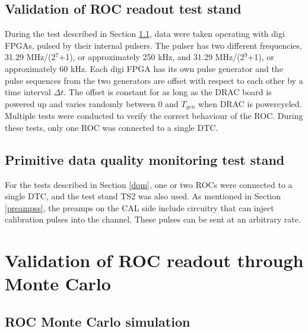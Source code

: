    \subsection{Validation of ROC readout test stand}
    During the test described in Section \ref{MonteCarlo}, data were taken operating with digi FPGAs, pulsed by their internal pulsers.
    The pulser has two different frequencies, 31.29 MHz/(2$^7$+1), or approximately 250 kHz, 
    and 31.29 MHz/(2$^9$+1), or approximately 60 kHz.
    Each digi FPGA has its own pulse generator and the pulse sequences from the two
    generators are offset with respect to each other by a time interval $\Delta t$. 
    The offset is constant for as long as the DRAC board is powered up and varies randomly between 0 and $T_{gen}$ when DRAC is powercycled. 
    Multiple tests were conducted to verify the correct behaviour of the ROC. 
    During these tests, only one ROC was connected to a single DTC. 
    \subsection{Primitive data quality monitoring test stand}
    For the tests described in Section \ref{dqm}, one or two ROCs 
    were connected to a single DTC, and the test stand TS2 was also used. 
    As mentioned in Section \ref{preampss}, the preamps on the CAL side 
    include circuitry that can inject calibration pulses into the channel. 
    These pulses can be sent at an arbitrary rate.
\section{Validation of ROC readout through Monte Carlo}

\subsection{ROC Monte Carlo simulation}\label{MonteCarlo}
 
